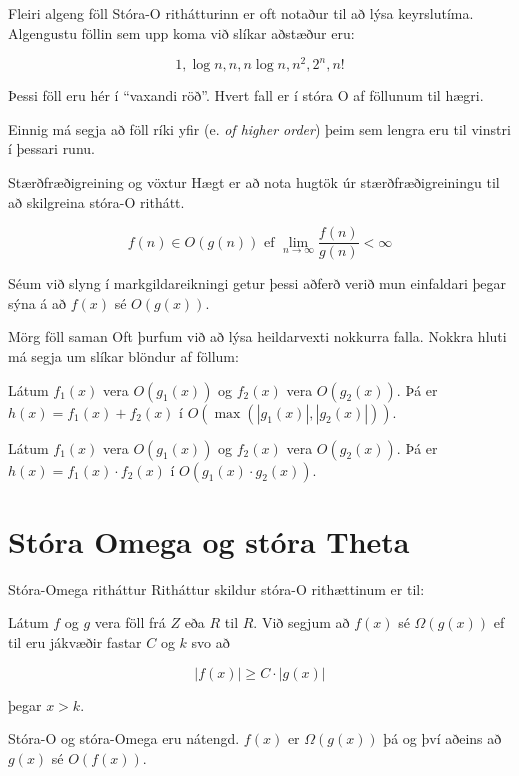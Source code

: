 \documentclass{beamer}
\begin{document}
\begin{frame}{Fleiri algeng föll}
Stóra-O rithátturinn er oft notaður til að lýsa keyrslutíma. Algengustu föllin sem upp koma við slíkar aðstæður eru:

\[
 1, \log n, n, n \log n, n^2 , 2^n , n!
\]

Þessi föll eru hér í ``vaxandi röð''. Hvert fall er í stóra O af föllunum til hægri.

Einnig má segja að föll ríki yfir (e. \emph{of higher order}) þeim sem lengra eru til vinstri í þessari runu.
\end{frame}

\begin{frame}{Stærðfræðigreining og vöxtur}
Hægt er að nota hugtök úr stærðfræðigreiningu til að skilgreina stóra-O rithátt.

\[
  f(n) \in O(g(n)) \text{ ef } \lim_{n\to \infty}\frac{f(n)}{g(n)} < \infty
\]

Séum við slyng í markgildareikningi getur þessi aðferð verið mun einfaldari þegar sýna á að $f(x)$ sé $O(g(x))$.
\end{frame}

\begin{frame}{Mörg föll saman}
Oft þurfum við að lýsa heildarvexti nokkurra falla. Nokkra hluti má segja um slíkar blöndur af föllum:
\begin{tcolorbox}[title=Samlagning falla]
Látum $f_1(x)$ vera $O(g_1(x))$ og $f_2(x)$ vera $O(g_2(x))$. Þá er $h(x) = f_1(x) + f_2(x)$ í $O(\max(|g_1(x)|, |g_2(x)|))$.
\end{tcolorbox}
\begin{tcolorbox}[title=Margföldun falla]
Látum $f_1(x)$ vera $O(g_1(x))$ og $f_2(x)$ vera $O(g_2(x))$. Þá er $h(x) = f_1(x) \cdot f_2(x)$ í $O(g_1(x)\cdot g_2(x))$.
\end{tcolorbox}

\end{frame}

\section{Stóra Omega og stóra Theta}

\begin{frame}{Stóra-Omega ritháttur}
Ritháttur skildur stóra-O rithættinum er til:

\begin{tcolorbox}[title=$\Omega$ ritháttur]
Látum $f$ og $g$ vera föll frá $Z$ eða $R$ til $R$. Við segjum að $f(x)$ sé $\Omega(g(x))$ ef til eru jákvæðir fastar $C$ og $k$ svo að

\[
 |f(x)| \geq C \cdot |g(x)|
\]

þegar $x > k$.
\end{tcolorbox}
\pause
Stóra-O og stóra-Omega eru nátengd. $f(x)$ er $\Omega(g(x))$ þá og því aðeins að $g(x)$ sé $O(f(x))$.
\end{frame}
\end{document}
